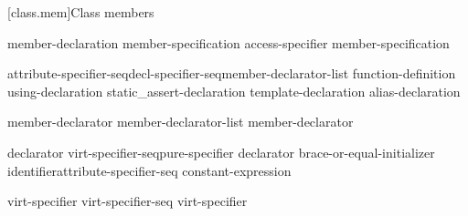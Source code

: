 [class.mem]{Class members}%
%

\begin{bnf}
\br
    member-declaration member-specification\opt\br
    access-specifier \terminal{:} member-specification\opt
\end{bnf}

\begin{bnf}
\br
    attribute-specifier-seq\opt decl-specifier-seq\opt member-declarator-list\opt \terminal{;}\br
    function-definition \terminal{;\opt}\br
    using-declaration\br
    static_assert-declaration\br
    template-declaration\br
    alias-declaration
\end{bnf}

\begin{bnf}
\br
    member-declarator\br
    member-declarator-list \terminal{,} member-declarator
\end{bnf}

\begin{bnf}
\br
    declarator virt-specifier-seq\opt pure-specifier\opt\br
    declarator brace-or-equal-initializer\opt\br
    identifier\opt attribute-specifier-seq\opt \terminal{:} constant-expression
\end{bnf}

\begin{bnf}
\br
    virt-specifier\br
    virt-specifier-seq virt-specifier
\end{bnf}

\begin{bnf}
\br
    \br
\end{bnf}

\begin{bnf}
\br
\end{bnf}

